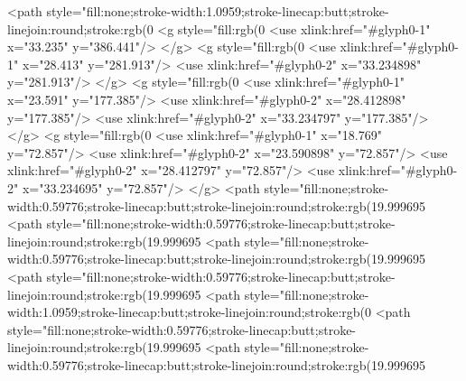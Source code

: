 <path style="fill:none;stroke-width:1.0959;stroke-linecap:butt;stroke-linejoin:round;stroke:rgb(0%
<g style="fill:rgb(0%
  <use xlink:href="#glyph0-1" x="33.235" y="386.441"/>
</g>
<g style="fill:rgb(0%
  <use xlink:href="#glyph0-1" x="28.413" y="281.913"/>
  <use xlink:href="#glyph0-2" x="33.234898" y="281.913"/>
</g>
<g style="fill:rgb(0%
  <use xlink:href="#glyph0-1" x="23.591" y="177.385"/>
  <use xlink:href="#glyph0-2" x="28.412898" y="177.385"/>
  <use xlink:href="#glyph0-2" x="33.234797" y="177.385"/>
</g>
<g style="fill:rgb(0%
  <use xlink:href="#glyph0-1" x="18.769" y="72.857"/>
  <use xlink:href="#glyph0-2" x="23.590898" y="72.857"/>
  <use xlink:href="#glyph0-2" x="28.412797" y="72.857"/>
  <use xlink:href="#glyph0-2" x="33.234695" y="72.857"/>
</g>
<path style="fill:none;stroke-width:0.59776;stroke-linecap:butt;stroke-linejoin:round;stroke:rgb(19.999695%
<path style="fill:none;stroke-width:0.59776;stroke-linecap:butt;stroke-linejoin:round;stroke:rgb(19.999695%
<path style="fill:none;stroke-width:0.59776;stroke-linecap:butt;stroke-linejoin:round;stroke:rgb(19.999695%
<path style="fill:none;stroke-width:0.59776;stroke-linecap:butt;stroke-linejoin:round;stroke:rgb(19.999695%
<path style="fill:none;stroke-width:1.0959;stroke-linecap:butt;stroke-linejoin:round;stroke:rgb(0%
<path style="fill:none;stroke-width:0.59776;stroke-linecap:butt;stroke-linejoin:round;stroke:rgb(19.999695%
<path style="fill:none;stroke-width:0.59776;stroke-linecap:butt;stroke-linejoin:round;stroke:rgb(19.999695%
